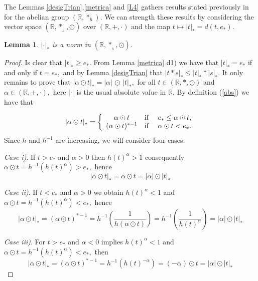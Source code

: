 \documentclass[10pt]{amsart}
\newtheorem{lemma}{Lemma}
\numberwithin{equation}{section}
\begin{document}
The Lemmas \ref{desigTrian},\ref{metrica} and \ref{L4} gathers results stated previously
in \cite{EPR} for the abelian group $(\mathbb{R},*_{h})$. We can strength these results
by considering the vector space $(\mathbb{R}, *_{_h}, \odot)$ over $(\mathbb{R}, +, \cdot)$ and 
the map $t\mapsto  |t|_* = d(t,e_*)$.

\begin{lemma}
$|\cdot|_*$ is a norm in  $(\mathbb R,*_{_h},\odot).$ 
\end{lemma}

\begin{proof}
Is clear that $|t|_* \ge e_*.$ From Lemma \ref{metrica} d1) we have that $|t|_*=e_* $ if and only if $t = e_*,$ and by Lemma \ref{desigTrian} that $|t*s|_* \le |t|_* * |s|_*.$ It only remains to prove that $|\alpha \odot t|_*= |\alpha|\, \odot \,  |t|_*,$ for all $t \in (\mathbb R,*,\odot)$ and $\alpha \in (\mathbb R,+,\cdot),$ here $|\cdot|$ is the usual absolute value  in $\mathbb{R}.$ By definition (\ref{abs}) we have that

\begin{equation*}
|\alpha \odot t|_{\ast}=\left\{\begin{array}{ccr}
\alpha \odot t &\textnormal{if}& e_{*}\leq \alpha \odot t, \\
(\alpha \odot t)^{\ast -1} &\textnormal{if}& \,\, \alpha \odot t <e_{\ast}.
\end{array}\right.
\end{equation*}
Since $h$ and $h^{-1}$ are increasing, we will consider four cases:

\medskip

\noindent \textit{Case i)}. If $t > e_*$ and $\alpha > 0$ then $h(t)^\alpha > 1$ consequently $\alpha \odot t= h^{-1}(h(t)^\alpha) > e_*,$ hence
    $$
    |\alpha \odot t|_* = \alpha \odot t = |\alpha| \odot |t|_*    $$


\noindent \textit{Case ii)}. If $t < e_*$ and $\alpha > 0$ we obtain $h(t)^\alpha < 1$ and $\alpha \odot t= h^{-1}(h(t)^\alpha) < e_*,$ hence
    $$
    |\alpha \odot t|_* = (\alpha \odot t)^{*-1} = h^{-1}\left(\frac{1}{h(\alpha \odot t)}\right) = 
h^{-1}\left(\frac{1}{h(t)^\alpha}\right)
   = |\alpha| \odot |t|_*    $$

\noindent \textit{Case iii)}. For $t > e_*$ and $\alpha < 0$ implies $h(t)^\alpha < 1$ and $\alpha \odot t= h^{-1}(h(t)^\alpha) < e_*,$ then
    $$
    |\alpha \odot t|_* = (\alpha \odot t)^{*-1} = h^{-1}(h(t)^{-\alpha}) = (-\alpha) \odot t   = |\alpha| \odot |t|_*    $$


\end{proof}
\end{document}
